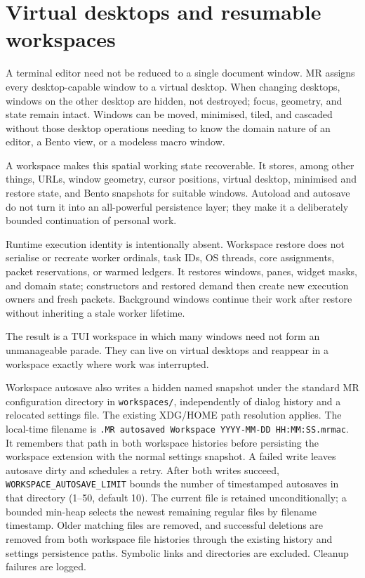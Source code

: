 \documentclass[a4paper,10pt,twoside,openany]{book}
\newcommand{\mr}{\textsc{MR}}
\begin{document}
\chapter{Virtual desktops and resumable workspaces}
\label{ch:workspaces}

A terminal editor need not be reduced to a single document window. \mr{}
assigns every desktop-capable window to a virtual desktop. When changing
desktops, windows on the other desktop are hidden, not destroyed; focus,
geometry, and state remain intact. Windows can be moved, minimised, tiled, and
cascaded without those desktop operations needing to know the domain nature of
an editor, a Bento view, or a modeless macro window.

A workspace makes this spatial working state recoverable. It stores, among
other things, URLs, window geometry, cursor positions, virtual desktop,
minimised and restore state, and Bento snapshots for suitable windows. Autoload
and autosave do not turn it into an all-powerful persistence layer; they make
it a deliberately bounded continuation of personal work.

Runtime execution identity is intentionally absent. Workspace restore does not
serialise or recreate worker ordinals, task IDs, OS threads, core assignments,
packet reservations, or warmed ledgers. It restores windows, panes, widget
masks, and domain state; constructors and restored demand then create new
execution owners and fresh packets. Background windows continue their work
after restore without inheriting a stale worker lifetime.

The result is a TUI workspace in which many windows need not form an
unmanageable parade. They can live on virtual desktops and reappear in a
workspace exactly where work was interrupted.

Workspace autosave also writes a hidden named snapshot under the standard MR
configuration directory in \texttt{workspaces/}, independently of dialog history
and a relocated settings file. The existing XDG/HOME path resolution applies.
The local-time filename is
\texttt{.MR autosaved Workspace YYYY-MM-DD HH:MM:SS.mrmac}. It remembers that path in both
workspace histories before persisting the workspace extension with the normal
settings snapshot. A failed write leaves autosave dirty and schedules a retry.
After both writes succeed, \texttt{WORKSPACE\_AUTOSAVE\_LIMIT} bounds the
number of timestamped autosaves in that directory (1--50, default 10). The
current file is retained unconditionally; a bounded min-heap selects the
newest remaining regular files by filename timestamp. Older matching files
are removed, and successful deletions are removed from both workspace file
histories through the existing history and settings persistence paths.
Symbolic links and directories are excluded. Cleanup failures are logged.
\end{document}
